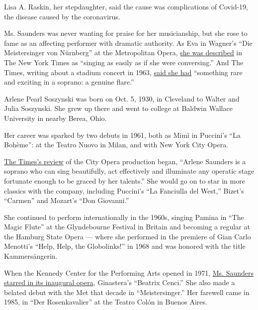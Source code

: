 Lisa A. Raskin, her stepdaughter, said the cause was complications of
Covid-19, the disease caused by the coronavirus.

Ms. Saunders was never wanting for praise for her musicianship, but she
rose to fame as an affecting performer with dramatic authority. As Eva
in Wagner's ``Die Meistersinger von Nürnberg'' at the Metropolitan
Opera,
\href{https://timesmachine.nytimes3xbfgragh.onion/timesmachine/1976/04/04/139798682.pdf?pdf_redirect=true\&ip=0}{she
was described} in The New York Times as ``singing as easily as if she
were conversing.'' And The Times, writing about a stadium concert in
1963,
\href{https://timesmachine.nytimes3xbfgragh.onion/timesmachine/1963/07/24/82081738.pdf?pdf_redirect=true\&ip=0}{said
she had} ``something rare and exciting in a soprano: a genuine flare.''

Arlene Pearl Soszynski was born on Oct. 5, 1930, in Cleveland to Walter
and Julia Soszynski. She grew up there and went to college at Baldwin
Wallace University in nearby Berea, Ohio.

Her career was sparked by two debuts in 1961, both as Mimì in Puccini's
``La Bohème'': at the Teatro Nuovo in Milan, and with New York City
Opera.

\href{https://timesmachine.nytimes3xbfgragh.onion/timesmachine/1961/10/30/119426196.pdf?pdf_redirect=true\&ip=0}{The
Times's review} of the City Opera production began, ``Arlene Saunders is
a soprano who can sing beautifully, act effectively and illuminate any
operatic stage fortunate enough to be graced by her talents.'' She would
go on to star in more classics with the company, including Puccini's
``La Fanciulla del West,'' Bizet's ``Carmen'' and Mozart's ``Don
Giovanni.''

She continued to perform internationally in the 1960s, singing Pamina in
``The Magic Flute'' at the Glyndebourne Festival in Britain and becoming
a regular at the Hamburg State Opera --- where she performed in the
premiere of Gian Carlo Menotti's ``Help, Help, the Globolinks!'' in 1968
and was honored with the title Kammersängerin.

When the Kennedy Center for the Performing Arts opened in 1971,
\href{https://timesmachine.nytimes3xbfgragh.onion/timesmachine/1971/09/19/91305513.pdf?pdf_redirect=true\&ip=0}{Ms.
Saunders starred in its inaugural opera}, Ginastera's ``Beatrix Cenci.''
She also made a belated debut with the Met that decade in
``Meistersinger.'' Her farewell came in 1985, in ``Der Rosenkavalier''
at the Teatro Colón in Buenos Aires.

